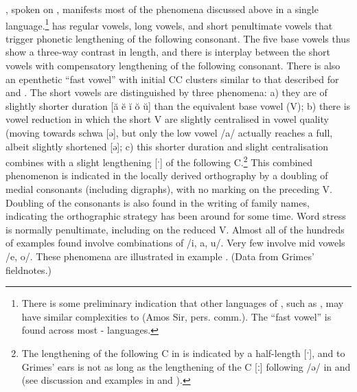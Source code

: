 \largerpage
{}, spoken on , manifests most of the phenomena discussed
above in a single language.\footnote{
		There is some preliminary indication that other languages
		of , such as , may have similar
		complexities to  (Amos Sir, pers.
		comm.).
		The “fast vowel” is found across most - languages.}
 has regular vowels,
long vowels, and short penultimate vowels that trigger phonetic
lengthening of the following consonant.
The five base vowels thus show a three-way contrast in length,
and there is interplay between the short vowels with compensatory
lengthening of the following consonant.
There is also an epenthetic ``fast vowel'' with initial CC clusters
similar to that described for  and .
The short vowels are distinguished by three phenomena: a) they
are of slightly shorter duration [ă ĕ ĭ ŏ ŭ] than the equivalent
base vowel (V); b) there is vowel reduction in which the short
V are slightly centralised in vowel quality (moving towards schwa
[ə], but only the low vowel /a/ actually reaches a full,
albeit slightly shortened [ə]; c) this shorter duration
and slight centralisation combines with a slight lengthening
[ˑ] of the following C.\footnote{
		The lengthening of the following
		C in  is indicated by a half-length [ˑ],
		and to Grimes' ears is not as long as the lengthening of the
		C [ː] following /ə/ in 
		and  (see discussion
		and examples in  and ).}
This combined phenomenon
is indicated in the locally derived orthography by a doubling
of medial consonants (including digraphs),
with no marking on the preceding V.
Doubling of the consonants is also found in the writing of family
names, indicating the orthographic strategy has been around for some time.
Word stress is normally penultimate,
including on the reduced V.
Almost all of the hundreds of examples found involve combinations
of /i, a, u/.
Very few involve mid vowels /e, o/.
These phenomena are illustrated in example .
(Data from Grimes' fieldnotes.)

